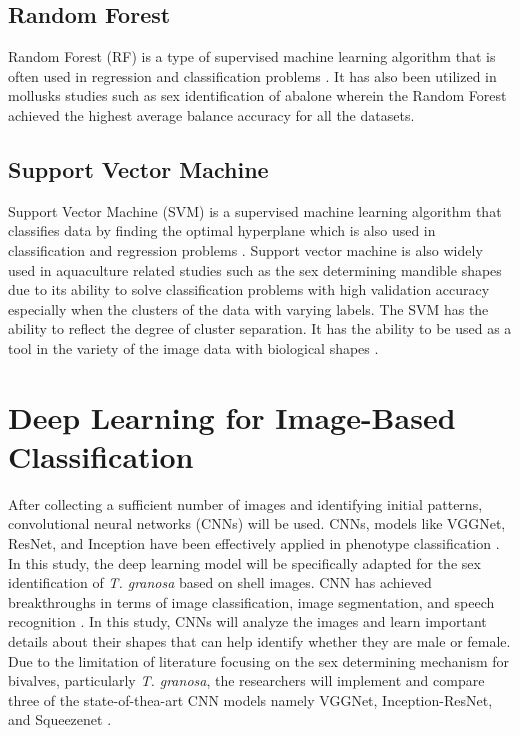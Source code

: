 \subsection{Random Forest}

Random Forest (RF) is a type of supervised machine learning algorithm that is often used in regression and classification problems \cite{cui2020}. It has also been utilized in mollusks studies such as sex identification of abalone wherein the Random Forest achieved the highest average balance accuracy for all the datasets\cite{arifin2021}.

\subsection{Support Vector Machine}

Support Vector Machine (SVM) is a supervised machine learning algorithm that classifies data by finding the optimal hyperplane which is also used in classification and regression problems \cite{cui2020}. Support vector machine is also widely used in aquaculture related studies such as the sex determining mandible shapes due to its ability to solve classification problems with high validation accuracy especially when the clusters of the data with varying labels. The SVM has the ability to reflect the degree of cluster separation. It has the ability to be used as a tool in the variety of the image data with biological shapes \cite{tsutsumi2023}.


\section{ Deep Learning for Image-Based Classification}
\label{sec:deeplearning}
After collecting a sufficient number of images and identifying initial patterns, convolutional neural networks (CNNs) will be used. CNNs, models like VGGNet, ResNet, and Inception have been effectively applied in phenotype classification \cite{kim2024}. In this study, the deep learning model will be specifically adapted for the sex identification of \textit{T. granosa} based on shell images. CNN has achieved breakthroughs in terms of image classification, image segmentation, and speech recognition \cite{he2018}. In this study, CNNs will analyze the images and learn important details about their shapes that can help identify whether they are male or female. Due to the limitation of literature focusing on the sex determining mechanism for bivalves, particularly \textit{T. granosa}, the researchers will implement and compare three of the state-of-thea-art CNN models namely VGGNet, Inception-ResNet, and Squeezenet . 

